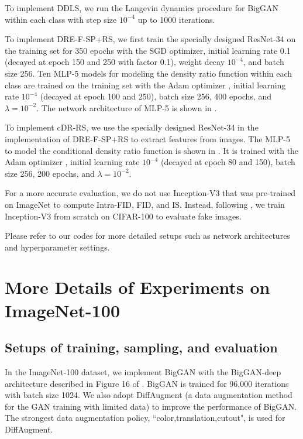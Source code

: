 \documentclass[final,12pt, 3p,times]{elsarticle}
\begin{document}
To implement DDLS, we run the Langevin dynamics procedure for BigGAN within each class with step size $10^{-4}$ up to 1000 iterations.

To implement DRE-F-SP+RS, we first train the specially designed ResNet-34 on the training set for 350 epochs with the SGD optimizer, initial learning rate 0.1 (decayed at epoch 150 and 250 with factor 0.1), weight decay $10^{-4}$, and batch size 256. Ten MLP-5 models for modeling the density ratio function within each class are trained on the training set with the Adam optimizer \cite{kingma2014adam}, initial learning rate $10^{-4}$ (decayed at epoch 100 and 250), batch size 256, 400 epochs, and $\lambda=10^{-2}$. The network architecture of MLP-5 is shown in . 

To implement cDR-RS, we use the specially designed ResNet-34 in the implementation of DRE-F-SP+RS to extract features from images. The MLP-5 to model the conditional density ratio function is shown in . It is trained with the Adam optimizer \cite{kingma2014adam}, initial learning rate $10^{-4}$ (decayed at epoch 80 and 150), batch size 256, 200 epochs, and $\lambda=10^{-2}$.

For a more accurate evaluation, we do not use Inception-V3 \cite{szegedy2016rethinking} that was pre-trained on ImageNet \cite{imagenet_cvpr09} to compute Intra-FID, FID, and IS. Instead, following \cite{ding2020subsampling}, we train Inception-V3 from scratch on CIFAR-100 to evaluate fake images. 

Please refer to our codes for more detailed setups such as network architectures and hyperparameter settings.




\section{More Details of Experiments on ImageNet-100}\label{supp:details_of_imagenet100}

\subsection{Setups of training, sampling, and evaluation}

In the ImageNet-100 dataset, we implement BigGAN with the BigGAN-deep architecture described in Figure 16 of \cite{brock2018large}. BigGAN is trained for 96,000 iterations with batch size 1024. We also adopt DiffAugment \cite{zhao2020differentiable} (a data augmentation method for the GAN training with limited data) to improve the performance of BigGAN. The strongest data augmentation policy, ``color,translation,cutout", is used for DiffAugment.
\end{document}
